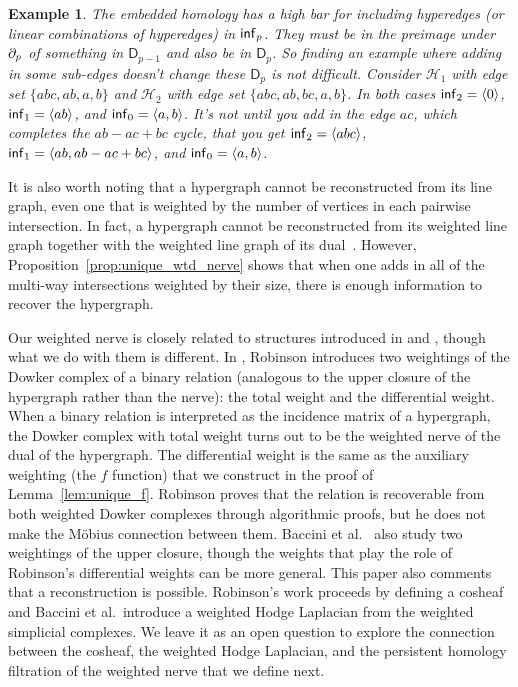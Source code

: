 \documentclass{amsart}
\newtheorem{example}[theorem]{Example}
\newcommand{\Dgroup}	    {\mathsf{D}}
\renewcommand{\H}{\mathcal{H}}
\newcommand{\bdr}{\mm{\mathrm{\partial}}}
\newcommand {\mm}[1]        {\ifmmode{#1}\else{\mbox{\(#1\)}}\fi}
\newcommand{\infgroup}{\mm{\mathsf{inf}}}
\begin{document}
\begin{example}
    The embedded homology has a high bar for including hyperedges (or linear combinations of hyperedges) in $\infgroup_p$. They must be in the preimage under $\bdr_p$ of something in $\Dgroup_{p-1}$ and also be in $\Dgroup_p$. So finding an example where adding in some sub-edges doesn't change these $\Dgroup_p$ is not difficult. Consider $\H_1$ with edge set $\{abc, ab, a, b\}$ and $\H_2$ with edge set $\{abc, ab, bc, a, b\}$. In both cases $\infgroup_2=\langle 0 \rangle$, $\infgroup_1 = \langle ab \rangle$, and $\infgroup_0 = \langle a, b \rangle$. It's not until you add in the edge $ac$, which completes the $ab-ac+bc$ cycle, that you get $\infgroup_2 = \langle abc \rangle$, $\infgroup_1 = \langle ab, ab-ac+bc \rangle$, and $\infgroup_0=\langle a,b\rangle$.
\end{example}

It is also worth noting that a hypergraph cannot be reconstructed from its line graph, even one that is weighted by the number of vertices in each pairwise intersection. In fact, a hypergraph cannot be reconstructed from its weighted line graph together with the weighted line graph of its dual~\cite{everett2013dual,kirkland2018two}. However, Proposition~\ref{prop:unique_wtd_nerve} shows that when one adds in all of the multi-way intersections weighted by their size, there is enough information to recover the hypergraph.

Our weighted nerve is closely related to structures introduced in \cite{robinson2022cosheaf} and \cite{PhysRevE.106.034319}, though what we do with them is different. 
In \cite{robinson2022cosheaf}, Robinson introduces two weightings of the Dowker complex of a binary relation (analogous to the upper closure of the hypergraph rather than the nerve): the total weight and the differential weight. 
When a binary relation is interpreted as the incidence matrix of a hypergraph, the Dowker complex with total weight turns out to be the weighted nerve of the dual of the hypergraph. The differential weight is the same as the auxiliary weighting (the $f$ function) that we construct in the proof of Lemma~\ref{lem:unique_f}. Robinson proves that the relation is recoverable from both weighted Dowker complexes through algorithmic proofs, but he does not make the M\"{o}bius connection between them. 
Baccini et al.~\cite{PhysRevE.106.034319} also study two weightings of the upper closure, though the weights that play the role of Robinson's differential weights can be more general. This paper also comments that a reconstruction is possible. 
Robinson's work proceeds by defining a cosheaf and Baccini et al.~introduce a weighted Hodge Laplacian from the weighted simplicial complexes.
We leave it as an open question to explore the connection between the cosheaf, the weighted Hodge Laplacian, and the persistent homology filtration of the weighted nerve that we define next.
\end{document}
